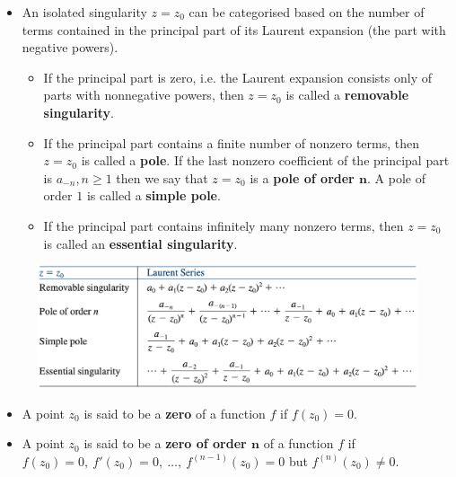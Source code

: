 \documentclass{article}
\begin{document}
\begin{itemize}
  \item An isolated singularity $z = z_0$ can be categorised based on the number of terms contained in the principal part of its Laurent expansion (the part with negative powers).

        \begin{itemize}
          \item If the principal part is zero, i.e. the Laurent expansion consists only of parts with nonnegative powers, then $z = z_0$ is called a \textbf{removable singularity}.

          \item If the principal part contains a finite number of nonzero terms, then $z = z_0$ is called a \textbf{pole}. If the last nonzero coefficient of the principal part is $a_{-n}, n \ge 1$ then we say that $z = z_0$ is a \textbf{pole of order $\boldsymbol{n}$}. A pole of order $1$ is called a \textbf{simple pole}.

          \item If the principal part contains infinitely many nonzero terms, then $z = z_0$ is called an \textbf{essential singularity}.
        \end{itemize}
\end{itemize}

\begin{figure}[H]
  \centering
  \includegraphics[width=\textwidth]{classification-of-isolated-singular-points}
\end{figure}

\begin{itemize}
  \item A point $z_0$ is said to be a \textbf{zero} of a function $f$ if $f(z_0) = 0$.

  \item A point $z_0$ is said to be a \textbf{zero of order $\boldsymbol{n}$} of a function $f$ if $f(z_0) = 0,\ f'(z_0) = 0,\ \ldots,\ f^{(n - 1)}(z_0) = 0$ but $f^{(n)}(z_0) \ne 0$.
\end{itemize}
\end{document}
